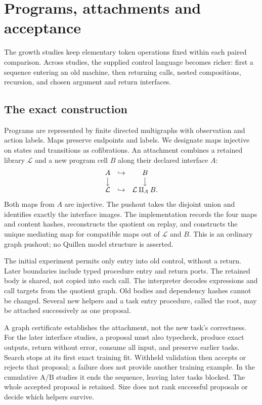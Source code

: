 \section{Programs, attachments and acceptance}
\label{sec:attachment}

The growth studies keep elementary token operations fixed within each paired
comparison. Across studies, the supplied control language becomes richer:
first a sequence entering an old machine, then returning calls, nested
compositions, recursion, and chosen argument and return interfaces.

\subsection{The exact construction}

Programs are represented by finite directed multigraphs with observation and
action labels. Maps preserve endpoints and labels. We designate maps injective
on states and transitions as cofibrations. An attachment combines a retained
library $\mathcal L$ and a new program cell $B$ along their declared interface
$A$:
\[
\begin{array}{ccc}
 A & \hookrightarrow & B \\
 \big\downarrow & & \big\downarrow \\
 \mathcal L & \hookrightarrow & \mathcal L\amalg_A B .
\end{array}
\]
Both maps from $A$ are injective. The pushout takes the disjoint union and
identifies exactly the interface images. The implementation records the four
maps and content hashes, reconstructs the quotient on replay, and constructs
the unique mediating map for compatible maps out of $\mathcal L$ and $B$.
This is an ordinary graph pushout; no Quillen model structure is asserted.

The initial experiment permits only entry into old control, without a return.
Later boundaries include typed procedure entry and return ports. The retained
body is shared, not copied into each call. The interpreter decodes expressions
and call targets from the quotient graph. Old bodies and dependency hashes
cannot be changed. Several new helpers and a task entry procedure, called the
root, may be attached successively as one proposal.

A graph certificate establishes the attachment, not the new task's correctness.
For the later interface studies, a proposal must also typecheck, produce exact
outputs, return without error, consume all input, and preserve earlier tasks.
Search stops at its first exact training fit. Withheld validation then accepts
or rejects that proposal; a failure does not provide another training example.
In the cumulative A/B studies it ends the sequence, leaving later tasks blocked.
The whole accepted proposal is retained. Size does not rank successful proposals
or decide which helpers survive.

